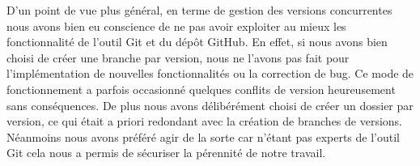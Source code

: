 D'un point de vue plus général, en terme de gestion des versions concurrentes nous avons bien eu conscience de ne pas avoir exploiter au mieux
les fonctionnalité de l'outil Git et du dépôt GitHub. En effet, si nous avons bien choisi de créer une branche par version, nous ne l'avons pas fait
pour l'implémentation de nouvelles fonctionnalités ou la correction de bug. Ce mode de fonctionnement a parfois occasionné quelques conflits de version 
heureusement sans conséquences. De plus nous avons délibérément choisi de créer un dossier par version, ce qui était a priori redondant avec la création
 de branches de versions. Néanmoins nous avons préféré agir de la sorte car n'étant pas experts de l'outil Git cela nous a permis de sécuriser la 
 pérennité de notre travail.

